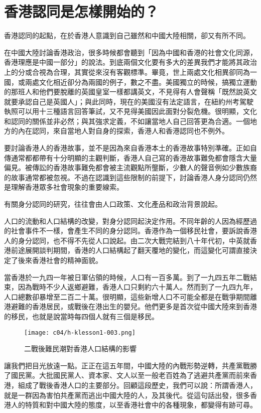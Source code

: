 \section{香港認同是怎樣開始的？}

香港認同的起點，在於香港人意識到自己雖然和中國大陸相關，卻又有所不同。

在中國大陸討論香港政治，很多時候都會聽到「因為中國和香港的社會文化同源，香港理應是中國一部分」的說法。到底兩個文化要有多大的差異我們才能將其政治上的分或合視為合理，其實從來沒有客觀標準。畢竟，世上兩處文化相異卻同為一國，或兩處文化相近卻分為兩國的例子，數之不盡。美國獨立的時候，搞獨立運動的那班人和他們要脫離的英國皇室一樣都講英文，不見得有人會聲稱「既然說英文就要承認自己是英國人」；與此同時，現在的美國沒有法定語言，在紐約州考駕駛執照可以用十三種語言回答筆試，又不見得美國因此面對分裂危機。很明顯，文化和認同的關係並非必然；與其強求定義，不如讓當地人自己回答更為合適。一個地方的內在認同，來自當地人對自身的探索，香港人和香港認同也不例外。

要討論香港人的香港故事，並不是因為來自香港本土的香港故事特別準確。正如自傳通常都都帶有十分明顯的主觀判斷，香港人自己寫的香港故事難免都會隱含大量偏見。被傳訟的香港故事難免都會被主流觀點所壟斷，少數人的聲音例如少數族裔的故事通常都被忽視。不過在認識到這些限制的前提下，討論香港人身分認同仍然是理解香港眾多社會現象的重要線索。

有關身分認同的研究，往往會由人口政策、文化產品和政治背景說起。

人口的流動和人口結構的改變，對身分認同起決定作用。不同年齡的人因為經歷過的社會事件不一樣，會產生不同的身分認同。香港作為一個移民社會，要訴說香港人的身分認同，也不得不先從人口說起。由二次大戰完結到八十年代初，中英就香港前途展開談判期間，香港的人口結構起了翻天覆地的變化，而這變化可謂直接決定了後來香港社會的精神面貌。

當香港於一九四一年被日軍佔領的時候，人口有一百多萬。到了一九四五年二戰結束，因為戰時不少人返鄉避難，香港人口只剩約六十萬人。然而到了一九四九年，人口總數卻暴增至二百二十萬。很明顯，這些新增人口不可能全都是在戰爭期間離港避難的香港居民，或戰後在港出生的嬰兒。他們更多是首次從中國大陸來到香港的移民，也就是說當時每四個人就有三個是移民。

\begin{figure}[htbp]
    \centering
    \texttt{[image: c04/h-klesson1-003.png]}
    \caption{二戰後難民潮對香港人口結構的影響} 
\end{figure}

讓我們把目光放遠一點。正正在這五年間，中國大陸的內戰形勢逆轉，共產黨戰勝了國民黨。大批國民黨人、資本家、文人以至一般老百姓為了逃避共產黨而前來香港，組成了戰後香港人口的主要部分。回顧這段歷史，我們可以說：所謂香港人，就是一群因為害怕共產黨而逃出中國大陸的人，及其後代。從這句話出發，很多香港人的特質和對中國大陸的態度，以至香港社會中的各種現象，都變得有跡可尋。

